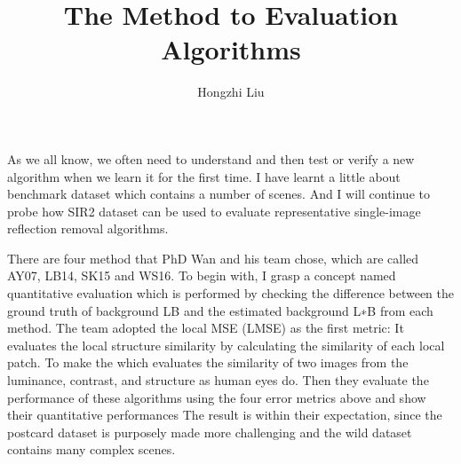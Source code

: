 \documentclass{article}
\author{Hongzhi Liu}
\title{The Method to Evaluation Algorithms}
\begin{document}
\maketitle
  \par
  As we all know, we often need to understand and then test or verify a new algorithm when we learn it for the first time. I have learnt a little about benchmark dataset which contains a number of scenes. And I will continue to probe how SIR2 dataset can be used to evaluate representative single-image reflection removal algorithms.
  
  There are four method that PhD Wan and his team
  chose, which are called AY07, LB14, SK15 and WS16. To begin with,  I grasp a concept named quantitative evaluation which is performed by checking the difference between the ground truth of background LB and the estimated background L∗B from each method. The team adopted the local MSE (LMSE) as the first metric: It evaluates the local structure similarity by calculating the similarity of each local patch. To make the which evaluates the similarity of two images from the luminance, contrast, and structure as human eyes do. Then they evaluate the performance of these algorithms using the four error metrics above and show their quantitative performances The result is within their expectation, since the postcard dataset is purposely made more challenging and the wild dataset contains many complex scenes. 
  
  
\end{document}
